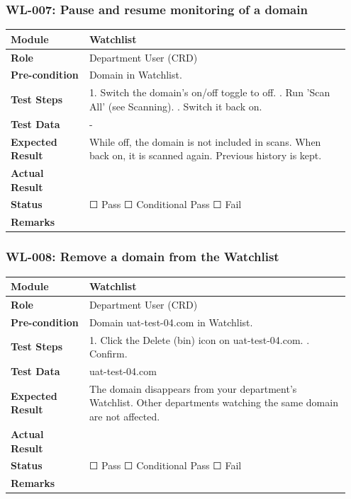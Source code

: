 \documentclass[10pt]{article}
\begin{document}
\subsubsection*{WL-007: Pause and resume monitoring of a domain}
\begin{longtable}{p{0.22\linewidth}p{0.73\linewidth}}
\hline
\textbf{Module} & Watchlist \\ \hline
\textbf{Role} & Department User (CRD) \\ \hline
\textbf{Pre-condition} & Domain in Watchlist. \\ \hline
\textbf{Test Steps} & 1. Switch the domain's on/off toggle to off. \newline 2. Run 'Scan All' (see Scanning). \newline 3. Switch it back on. \\ \hline
\textbf{Test Data} & - \\ \hline
\textbf{Expected Result} & While off, the domain is not included in scans. When back on, it is scanned again. Previous history is kept. \\ \hline
\textbf{Actual Result} & \newline \newline \\ \hline
\textbf{Status} & ☐ Pass \quad ☐ Conditional Pass \quad ☐ Fail \\ \hline
\textbf{Remarks} & \newline \\ \hline
\end{longtable}
\subsubsection*{WL-008: Remove a domain from the Watchlist}
\begin{longtable}{p{0.22\linewidth}p{0.73\linewidth}}
\hline
\textbf{Module} & Watchlist \\ \hline
\textbf{Role} & Department User (CRD) \\ \hline
\textbf{Pre-condition} & Domain uat-test-04.com in Watchlist. \\ \hline
\textbf{Test Steps} & 1. Click the Delete (bin) icon on uat-test-04.com. \newline 2. Confirm. \\ \hline
\textbf{Test Data} & uat-test-04.com \\ \hline
\textbf{Expected Result} & The domain disappears from your department's Watchlist. Other departments watching the same domain are not affected. \\ \hline
\textbf{Actual Result} & \newline \newline \\ \hline
\textbf{Status} & ☐ Pass \quad ☐ Conditional Pass \quad ☐ Fail \\ \hline
\textbf{Remarks} & \newline \\ \hline
\end{longtable}
\end{document}

